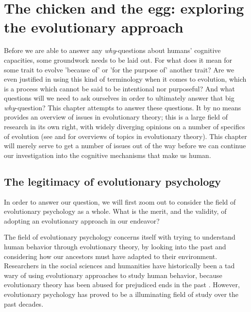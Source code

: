 \chapter{The chicken and the egg: exploring the evolutionary approach}


Before we are able to answer any \emph{why}-questions about humans' cognitive capacities, some groundwork needs to be laid out. For what does it mean for some trait to evolve 'because of' or 'for the purpose of' another trait? Are we even justified in using this kind of terminology when it comes to evolution, which is a process which cannot be said to be intentional nor purposeful? And what questions will we need to ask ourselves in order to ultimately answer that big  \emph{why}-question?
This chapter attempts to answer these questions. It by no means provides an overview of issues in evolutionary theory; this is a large field of research in its own right, with widely diverging opinions on a number of specifics of evolution (see \citet{Ariew02} and \citet{UllerLaland19} for overviews of topics in evolutionary theory).
This chapter will merely serve to get a number of issues out of the way before we can continue our investigation into the cognitive mechanisms that make us human.

\section{The legitimacy of evolutionary psychology}

In order to answer our question, we will first zoom out to consider the field of evolutionary psychology as a whole. What is the merit, and the validity, of adopting an evolutionary approach in our endeavor?

The field of evolutionary psychology concerns itself with trying to understand human behavior through evolutionary theory, by looking into the past and considering how our ancestors must have adapted to their environment.
Researchers in the social sciences and humanities have historically been a tad wary of using evolutionary approaches to study human behavior, because evolutionary theory has been abused for prejudiced ends in the past \citep[pp.~19--20]{LB02}. However, evolutionary psychology has proved to be a illuminating field of study over the past decades.

